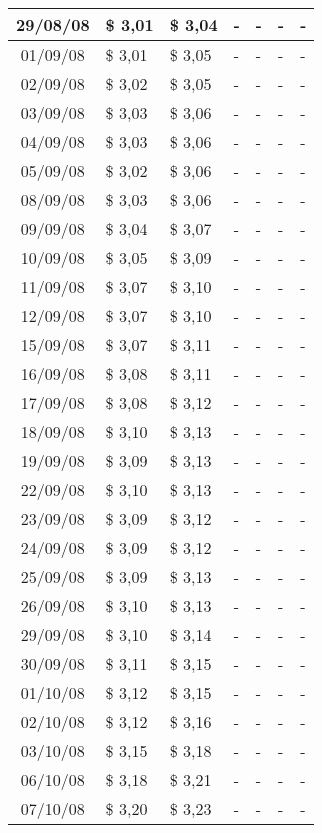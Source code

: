 \begin{center}
\begin{longtable}{|c|p{1.5cm}|p{1.5cm}|p{1.5cm}|p{1.5cm}|p{1.5cm}|p{1.5cm}|}
29/08/08 & \$ 3,01 & \$ 3,04 & - & - & - & - \\ \hline
01/09/08 & \$ 3,01 & \$ 3,05 & - & - & - & - \\ \hline
02/09/08 & \$ 3,02 & \$ 3,05 & - & - & - & - \\ \hline
03/09/08 & \$ 3,03 & \$ 3,06 & - & - & - & - \\ \hline
04/09/08 & \$ 3,03 & \$ 3,06 & - & - & - & - \\ \hline
05/09/08 & \$ 3,02 & \$ 3,06 & - & - & - & - \\ \hline
08/09/08 & \$ 3,03 & \$ 3,06 & - & - & - & - \\ \hline
09/09/08 & \$ 3,04 & \$ 3,07 & - & - & - & - \\ \hline
10/09/08 & \$ 3,05 & \$ 3,09 & - & - & - & - \\ \hline
11/09/08 & \$ 3,07 & \$ 3,10 & - & - & - & - \\ \hline
12/09/08 & \$ 3,07 & \$ 3,10 & - & - & - & - \\ \hline
15/09/08 & \$ 3,07 & \$ 3,11 & - & - & - & - \\ \hline
16/09/08 & \$ 3,08 & \$ 3,11 & - & - & - & - \\ \hline
17/09/08 & \$ 3,08 & \$ 3,12 & - & - & - & - \\ \hline
18/09/08 & \$ 3,10 & \$ 3,13 & - & - & - & - \\ \hline
19/09/08 & \$ 3,09 & \$ 3,13 & - & - & - & - \\ \hline
22/09/08 & \$ 3,10 & \$ 3,13 & - & - & - & - \\ \hline
23/09/08 & \$ 3,09 & \$ 3,12 & - & - & - & - \\ \hline
24/09/08 & \$ 3,09 & \$ 3,12 & - & - & - & - \\ \hline
25/09/08 & \$ 3,09 & \$ 3,13 & - & - & - & - \\ \hline
26/09/08 & \$ 3,10 & \$ 3,13 & - & - & - & - \\ \hline
29/09/08 & \$ 3,10 & \$ 3,14 & - & - & - & - \\ \hline
30/09/08 & \$ 3,11 & \$ 3,15 & - & - & - & - \\ \hline
01/10/08 & \$ 3,12 & \$ 3,15 & - & - & - & - \\ \hline
02/10/08 & \$ 3,12 & \$ 3,16 & - & - & - & - \\ \hline
03/10/08 & \$ 3,15 & \$ 3,18 & - & - & - & - \\ \hline
06/10/08 & \$ 3,18 & \$ 3,21 & - & - & - & - \\ \hline
07/10/08 & \$ 3,20 & \$ 3,23 & - & - & - & - \\ \hline

\end{longtable}
\end{center}
